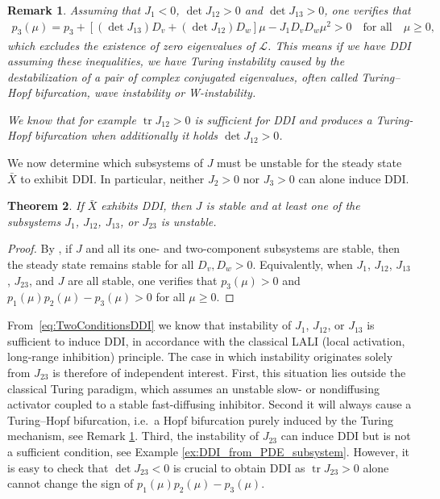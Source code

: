 \documentclass[12pt, a4paper]{amsart}
\numberwithin{equation}{section}
\newcommand{\CSS}{\bar{X}}
\newcommand{\Ds}{D_v}
\newcommand{\Df}{D_w}
\renewcommand{\L}{{\mathcal{L}}}
\DeclareMathOperator{\tr}{tr}
\newtheorem{theorem}{\bf Theorem}[section]
\newtheorem{remark}[theorem]{\bf Remark}
\begin{document}
\begin{remark}\label{rem:Turing-Hopf}
    Assuming that $J_1<0$, $\det J_{12} > 0$ and $\det J_{13} >0$, one verifies that
    \begin{align*}
        p_3(\mu) = p_3 + [(\det J_{13})\Ds + (\det J_{12})\Df] \mu - J_1 \Ds \Df \mu^2
        > 0 \quad \text{for all} \quad \mu \geqslant 0,
    \end{align*}
    which excludes the existence of zero eigenvalues of $\L$.
    This means if we have DDI assuming these inequalities, we have Turing instability caused by the destabilization of a pair of complex conjugated eigenvalues, often called Turing--Hopf bifurcation, wave instability or W-instability.

    We know that for example $\tr J_{12} > 0$ is sufficient for DDI and produces a Turing-Hopf bifurcation when additionally it holds $\det J_{12} > 0$.
\end{remark}

We now determine which subsystems of $J$ must be unstable for the
steady state $\CSS$ to exhibit DDI. In particular, neither $J_2>0$ nor $J_3>0$ can alone induce DDI.
\begin{theorem}\label{prop:Discussion_possibil_DDI_3_equs}
If $\CSS$ exhibits DDI, then $J$ is stable and at least one of the subsystems $J_1$, $J_{12}$, $J_{13}$, or $J_{23}$ is unstable.
\end{theorem}
\begin{proof}
By \cite[Theorem~1.2]{Sakamoto12}, if $J$ and all its one- and two-component
subsystems are stable, then the steady state remains stable for all
$\Ds,\Df>0$. Equivalently, when $J_1$, $J_{12}$, $J_{13}$, $J_{23}$, and $J$ are all stable,
one verifies that $p_3(\mu)>0$ and $p_1(\mu)p_2(\mu)-p_3(\mu)>0$ for all
$\mu\geqslant 0$. 
\end{proof}

From~\eqref{eq:TwoConditionsDDI} we know that instability of $J_1$,
$J_{12}$, or $J_{13}$ is sufficient to induce DDI, in accordance with the classical LALI (local activation,
long-range inhibition) principle.
The case in which instability originates solely from $J_{23}$ is therefore of independent interest.
First, this situation lies outside the classical Turing paradigm,
which assumes an unstable slow- or nondiffusing activator coupled
to a stable fast-diffusing inhibitor.
Second it will always cause a Turing--Hopf bifurcation, i.e.\ a Hopf bifurcation purely induced by the Turing mechanism, see Remark \ref{rem:Turing-Hopf}. 
Third, the instability of $J_{23}$ can induce DDI but is not a sufficient condition, see Example \ref{ex:DDI_from_PDE_subsystem}.
However, it is easy to check that $\det J_{23} < 0$ is crucial to obtain DDI as $\tr J_{23} > 0$ alone cannot change the sign of $p_1(\mu)p_2(\mu)-p_3(\mu)$.
\end{document}
